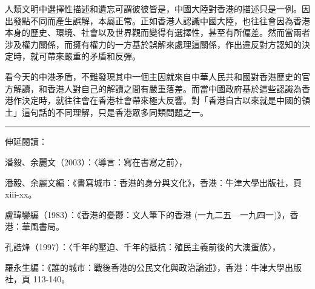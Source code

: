 人類文明中選擇性描述和遺忘可謂彼彼皆是，中國大陸對香港的描述只是一例。因出發點不同而產生誤解，本屬正常。正如香港人認識中國大陸，也往往會因為香港本身的歷史、環境、社會以及世界觀而變得有選擇性，甚至有所偏差。然而當兩者涉及權力關係，而擁有權力的一方基於誤解來處理這關係，作出違反對方認知的決定時，就可帶來嚴重的矛盾和反彈。

看今天的中港矛盾，不難發現其中一個主因就來自中華人民共和國對香港歷史的官方解讀，和香港人對自己的解讀之間有嚴重落差。而當中國政府基於這些認識為香港作決定時，就往往會在香港社會帶來極大反響。對「香港自古以來就是中國的領土」這句話的不同理解，只是香港眾多同類問題之一。

\rule[-10pt]{15cm}{0.05em}

伸延閱讀：

潘毅、余麗文（2003）：〈導言：寫在書寫之前〉，

潘毅、余麗文編：《書寫城市：香港的身分與文化》，香港：牛津大學出版社，頁 xiii-xx。

盧瑋鑾編（1983）：《香港的憂鬱：文人筆下的香港 (一九二五—一九四一)》，香港：華風書局。

孔誥烽（1997）：〈千年的壓迫、千年的抵抗：殖民主義前後的大澳蛋族〉，

羅永生編：《誰的城市：戰後香港的公民文化與政治論述》，香港：牛津大學出版社，頁 113-140。